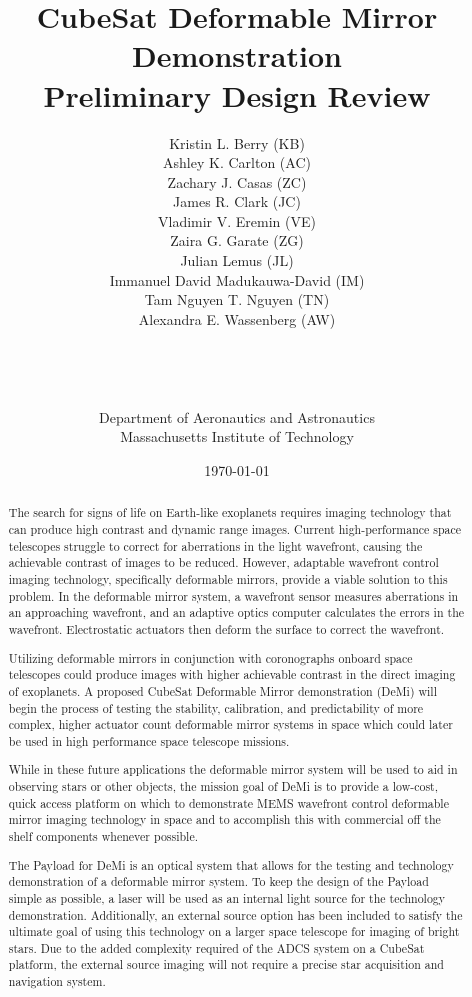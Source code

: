 \documentclass[12pt]{article}
\title{CubeSat Deformable Mirror Demonstration\\Preliminary Design Review\\}
\author{Kristin L. Berry (KB)\\
Ashley K. Carlton (AC)\\
Zachary J. Casas (ZC)\\
James R. Clark (JC)\\
Vladimir V. Eremin (VE)\\ 
Zaira G. Garate (ZG)\\ 
Julian Lemus (JL)\\
Immanuel David Madukauwa-David (IM)\\
Tam Nguyen T. Nguyen (TN)\\
Alexandra E. Wassenberg (AW)\\\\\\\\\\
Department of Aeronautics and Astronautics\\
Massachusetts Institute of Technology\\
}
\date{\today}
\begin{document}
\maketitle
\newpage

\renewcommand{\abstractname}{Executive Summary - ZG, AW}
\begin{abstract}
The search for signs of life on Earth-like exoplanets requires imaging technology that can produce high contrast and dynamic range images.  Current high-performance space telescopes struggle to correct for aberrations in the light wavefront, causing the achievable contrast of images to be reduced.  However, adaptable wavefront control imaging technology, specifically deformable mirrors, provide a viable solution to this problem.  In the deformable mirror system, a wavefront sensor measures aberrations in an approaching wavefront, and an adaptive optics computer calculates the errors in the wavefront.  Electrostatic actuators then deform the surface to correct the wavefront. 

Utilizing deformable mirrors in conjunction with coronographs onboard space telescopes could produce images with higher achievable contrast in the direct imaging of exoplanets.  
A proposed CubeSat Deformable Mirror demonstration (DeMi) will begin the process of testing the stability, calibration, and predictability of more complex, higher actuator count deformable mirror systems in space which could later be used in high performance space telescope missions. 

While in these future applications the deformable mirror system will be used to aid in observing stars or other objects, the mission goal of DeMi is to provide a low-cost, quick access platform on which to demonstrate MEMS wavefront control deformable mirror imaging technology in space and to accomplish this with commercial off the shelf components whenever possible.  

The Payload for DeMi is an optical system that allows for the testing and technology demonstration of a deformable mirror system.  To keep the design of the Payload simple as possible, a laser will be used as an internal light source for the technology demonstration.  Additionally, an external source option has been included to satisfy the ultimate goal of using this technology on a larger space telescope for imaging of bright stars. Due to the added complexity required of the ADCS system on a CubeSat platform, the external source imaging will not require a precise star acquisition and navigation system. 


\end{abstract}
\end{document}

